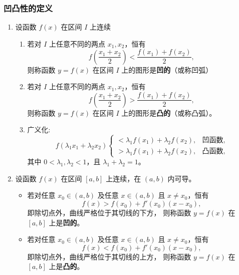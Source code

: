 \documentclass[a4paper,12pt]{article}
\begin{document}
    \subsubsection{凹凸性的定义}
    \begin{enumerate}
        \item \begin{definition}
                  设函数 $f(x)$ 在区间 $I$ 上连续
                  \begin{enumerate}
                      \item 若对 $I$ 上任意不同的两点 $x_1,x_2$，恒有
                      \[
                          f\!\left(\frac{x_1+x_2}{2}\right) < \frac{f(x_1)+f(x_2)}{2},
                      \]
                      则称函数 $y=f(x)$ 在区间 $I$ 上的图形是\textbf{凹的}（或称凹弧）

                      \item 若对 $I$ 上任意不同的两点 $x_1,x_2$，恒有
                      \[
                          f\!\left(\frac{x_1+x_2}{2}\right) > \frac{f(x_1)+f(x_2)}{2},
                      \]
                      则称函数 $y=f(x)$ 在区间 $I$ 上的图形是\textbf{凸的}（或称凸弧）。
                      \item 广义化:
                      \[
                          f(\lambda_1 x_1 + \lambda_2 x_2)
                          \begin{cases}
                              < \lambda_1 f(x_1) + \lambda_2 f(x_2), & \text{凹函数},\\
                              > \lambda_1 f(x_1) + \lambda_2 f(x_2), & \text{凸函数},
                          \end{cases}
                      \]
                      其中 $0 < \lambda_1,\lambda_2 < 1$，且 $\lambda_1+\lambda_2=1$。
                  \end{enumerate}
        \end{definition}
        \item 设函数 $f(x)$ 在区间 $[a,b]$ 上连续，在 $(a,b)$ 内可导。

        \begin{itemize}
            \item 若对任意 $x_0\in(a,b)$ 及任意 $x\in(a,b)$ 且 $x\neq x_0$，恒有
            \[
                f(x) > f(x_0) + f'(x_0)(x - x_0),
            \]
            即除切点外，曲线严格位于其切线的下方，
            则称函数 $y=f(x)$ 在 $[a,b]$ 上是\textbf{凹的}。

            \item 若对任意 $x_0\in(a,b)$ 及任意 $x\in(a,b)$ 且 $x\neq x_0$，恒有
            \[
                f(x) < f(x_0) + f'(x_0)(x - x_0),
            \]
            即除切点外，曲线严格位于其切线的上方，
            则称函数 $y=f(x)$ 在 $[a,b]$ 上是\textbf{凸的}。
        \end{itemize}
    \end{enumerate}
\end{document}
